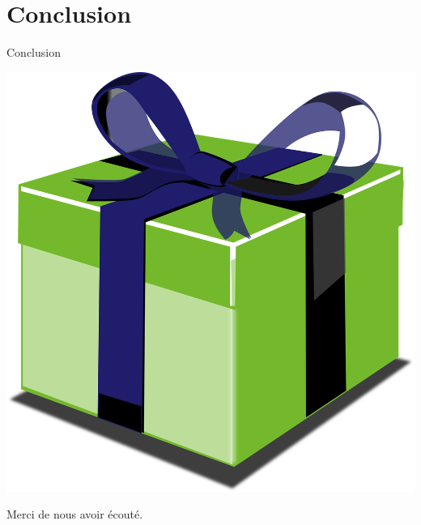 \documentclass[11pt,xcolor=dvipsnames]{beamer}
\begin{document}
\section*{Conclusion}
\begin{frame}{Conclusion}
	\begin{center}
		\includegraphics[scale=0.1]{../img/paquito.png}
	
		Merci de nous avoir écouté. 

	\end{center}
\end{frame}
\end{document}
